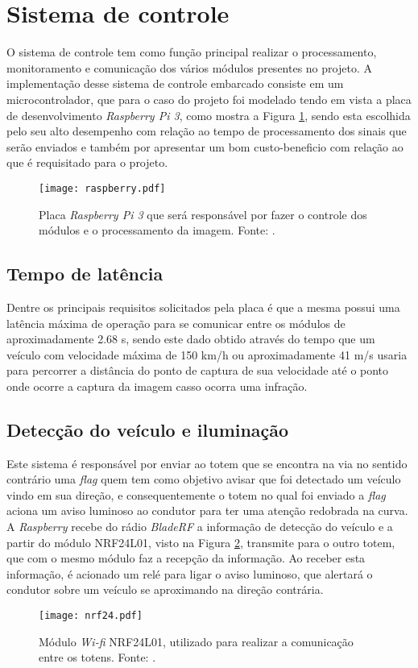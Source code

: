 \section{Sistema de controle}
    O sistema de controle tem como função principal realizar o processamento, monitoramento e comunicação dos vários módulos presentes no projeto. A implementação desse sistema de controle embarcado consiste em um microcontrolador, que para o caso do projeto foi modelado tendo em vista a placa de desenvolvimento \emph{Raspberry Pi 3}, como mostra a Figura \ref{raspberry}, sendo esta escolhida pelo seu alto desempenho com relação ao tempo de processamento dos sinais que serão enviados e também por apresentar um bom custo-beneficio com relação ao que é requisitado para o projeto. 
    \begin{figure}[H]
    \centering
   \texttt{[image: raspberry.pdf]}
   \caption{Placa \emph{Raspberry Pi 3} que será responsável por fazer o controle dos módulos e o processamento da imagem. Fonte: \cite{rasp}.}
   \label{raspberry}
    \end{figure}
    \subsection{Tempo de latência}
    Dentre os principais requisitos solicitados pela placa é que a mesma possui uma latência máxima de operação para se comunicar entre os módulos de aproximadamente 2.68 s, sendo este dado obtido através do tempo que um veículo com velocidade máxima de 150 km/h ou aproximadamente 41 m/s usaria para percorrer a distância do ponto de captura de sua velocidade até o ponto onde ocorre a captura da imagem casso ocorra uma infração. 
    \subsection{Detecção do veículo e iluminação}
    Este sistema é responsável por enviar ao totem que se encontra na via no sentido contrário uma \emph{flag} quem tem como objetivo avisar que foi detectado um veículo vindo em sua direção, e consequentemente o totem no qual foi enviado a \emph{flag} aciona um aviso luminoso ao condutor para ter uma atenção redobrada na curva. A \emph{Raspberry} recebe do rádio \emph{BladeRF} a informação de detecção do veículo e a partir do módulo NRF24L01, visto na Figura \ref{nrf24}, transmite para o outro totem, que com o mesmo módulo faz a recepção da informação. Ao receber esta informação, é acionado um relé para ligar o aviso luminoso, que alertará o condutor sobre um veículo se aproximando na direção contrária.  
    \begin{figure}[H]
    \centering
    \texttt{[image: nrf24.pdf]}
    \caption{Módulo \emph{Wi-fi} NRF24L01, utilizado para realizar a comunicação entre os totens. Fonte: \cite{NRF}.}
    \label{nrf24}
\end{figure}
